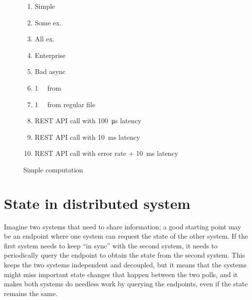 \documentclass[10 pt, twocolumn]{article}
\begin{document}
\begin{figure*}[h]
  \begin{enumerate}[i]
    \item Simple
    \item Some ex.
    \item All ex.
    \item Enterprise
    \item Bad async
    \item \SI{1}{\mebi\byte} from 
    \item \SI{1}{\mebi\byte} from regular file
    \item REST API call with \SI{100}{\micro\second} latency
    \item REST API call with \SI{10}{\milli\second} latency
    \item REST API call with  error rate + \SI{10}{\milli\second} latency
  \end{enumerate}
  \caption{Simple computation}
  \label{plot:simple-computation-xl}
\end{figure*}

\section{State in distributed system}
Imagine two systems that need to share information; a good starting point may be an endpoint where one system can request the state of the other system. If the first system needs to keep ``in sync'' with the second system, it needs to periodically query the endpoint to obtain the state from the second system. This keeps the two systems independent and decoupled, but it means that the systems might miss important state changes that happen between the two polls, and it makes both systems do needless work by querying the endpoints, even if the state remains the same.
\end{document}
